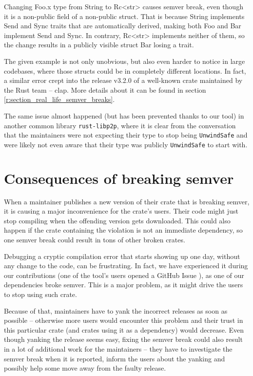\documentclass[licencjacka,en]{pracamgr}
\begin{document}
Changing {\ttfamily Foo.x} type from {\ttfamily String} to {\ttfamily Rc<str>}
causes semver break, even though it is a non-public field of a non-public struct.
That is because {\ttfamily String} implements {\ttfamily Send} and {\ttfamily Sync} traits
that are automatically derived, making both {\ttfamily Foo} and {\ttfamily Bar}
implement {\ttfamily Send} and {\ttfamily Sync}.
In contrary, {\ttfamily Rc<str>} implements neither of them,
so the change results in a publicly visible struct {\ttfamily Bar} losing a trait.

The given example is not only unobvious, but also even harder to notice in large codebases, where
those structs could be in completely different locations. In fact, a similar error crept into the
release v3.2.0 of a well-known crate maintained by the Rust team -- {\ttfamily clap}. More details
about it can be found in section \ref{r:section_real_life_semver_breaks}.

The same issue almost happened (but has been prevented thanks to our tool) in another common
library \texttt{rust-libp2p}, where it is clear from the conversation \cite{issue-libp2p} that
the maintainers were not expecting their type to stop being \texttt{UnwindSafe} and were likely
not even aware that their type was publicly \texttt{UnwindSafe} to start with.

\section{Consequences of breaking semver}\label{r:section_semver_breaking_consequences}

When a maintainer publishes a new version of their crate that is breaking semver,
it is causing a major inconvenience for the crate's users.
Their code might just stop compiling when the offending version gets downloaded.
This could also happen if the crate containing the violation is not an immediate dependency,
so one semver break could result in tons of other broken crates.

Debugging a cryptic compilation error that starts showing up one day,
without any change to the code, can be frustrating. In fact, we have experienced it during our
contributions (one of the tool's users opened a GitHub Issue \cite{issue-compiling-fails}), as one
of our dependencies broke semver. This is a major problem, as it might drive the users to stop
using such crate.

Because of that, maintainers have to yank the incorrect releases as soon as possible -- otherwise
more users would encounter this problem and their trust in this particular crate (and crates using
it as a dependency) would decrease. Even though yanking the release seems easy, fixing the semver
break could also result in a lot of additional work for the maintainers -- they have to investigate
the semver break when it is reported, inform the users about the yanking and possibly help some
move away from the faulty release.
\end{document}
